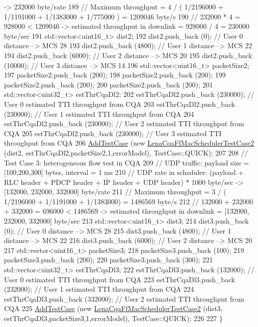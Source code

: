 \begin{DoxyCode}
{       -> 232000 byte/rate }
189   \textcolor{comment}{// Maximum throughput = 4 / ( 1/2196000 + 1/1191000 + 1/1383000 + 1/775000 ) = 1209046 byte/s}
190   \textcolor{comment}{// 232000 * 4 = 928000 < 1209046 -> estimated throughput in downlink = 928000 / 4 = 230000 byte/sec}
191   std::vector<uint16\_t> dist2;
192   dist2.push\_back (0);       \textcolor{comment}{// User 0 distance --> MCS 28}
193   dist2.push\_back (4800);    \textcolor{comment}{// User 1 distance --> MCS 22}
194   dist2.push\_back (6000);    \textcolor{comment}{// User 2 distance --> MCS 20}
195   dist2.push\_back (10000);   \textcolor{comment}{// User 3 distance --> MCS 14}
196   std::vector<uint16\_t> packetSize2;
197   packetSize2.push\_back (200);
198   packetSize2.push\_back (200);
199   packetSize2.push\_back (200);
200   packetSize2.push\_back (200);
201   std::vector<uint32\_t> estThrCqaDl2;
202   estThrCqaDl2.push\_back (230000); \textcolor{comment}{// User 0 estimated TTI throughput from CQA}
203   estThrCqaDl2.push\_back (230000); \textcolor{comment}{// User 1 estimated TTI throughput from CQA}
204   estThrCqaDl2.push\_back (230000); \textcolor{comment}{// User 2 estimated TTI throughput from CQA}
205   estThrCqaDl2.push\_back (230000); \textcolor{comment}{// User 3 estimated TTI throughput from CQA}
206   \hyperlink{classns3_1_1TestCase_a3718088e3eefd5d6454569d2e0ddd835}{AddTestCase} (\textcolor{keyword}{new} \hyperlink{classLenaCqaFfMacSchedulerTestCase2}{LenaCqaFfMacSchedulerTestCase2} (dist2,
      estThrCqaDl2,packetSize2,1,errorModel), TestCase::QUICK);
207 
208   \textcolor{comment}{// Test Case 3: heterogeneous flow test in CQA}
209   \textcolor{comment}{//   UDP traffic: payload size = [100,200,300] bytes, interval = 1 ms}
210   \textcolor{comment}{//   UDP rate in scheduler: (payload + RLC header + PDCP header + IP header + UDP header) * 1000 byte/sec
       -> [132000, 232000, 332000] byte/rate}
211   \textcolor{comment}{// Maximum throughput = 3 / ( 1/2196000 + 1/1191000 + 1/1383000) = 1486569 byte/s}
212   \textcolor{comment}{// 132000 + 232000 + 332000 = 696000 < 1486569 -> estimated throughput in downlink = [132000, 232000,
       332000] byte/sec}
213   std::vector<uint16\_t> dist3;
214   dist3.push\_back (0);    \textcolor{comment}{// User 0 distance --> MCS 28}
215   dist3.push\_back (4800);    \textcolor{comment}{// User 1 distance --> MCS 22}
216   dist3.push\_back (6000);    \textcolor{comment}{// User 2 distance --> MCS 20}
217   std::vector<uint16\_t> packetSize3;
218   packetSize3.push\_back (100);
219   packetSize3.push\_back (200);
220   packetSize3.push\_back (300);
221   std::vector<uint32\_t> estThrCqaDl3;
222   estThrCqaDl3.push\_back (132000); \textcolor{comment}{// User 0 estimated TTI throughput from CQA}
223   estThrCqaDl3.push\_back (232000); \textcolor{comment}{// User 1 estimated TTI throughput from CQA}
224   estThrCqaDl3.push\_back (332000); \textcolor{comment}{// User 2 estimated TTI throughput from CQA}
225   \hyperlink{classns3_1_1TestCase_a3718088e3eefd5d6454569d2e0ddd835}{AddTestCase} (\textcolor{keyword}{new} \hyperlink{classLenaCqaFfMacSchedulerTestCase2}{LenaCqaFfMacSchedulerTestCase2} (dist3,
      estThrCqaDl3,packetSize3,1,errorModel), TestCase::QUICK);
226 
227 \}
\end{DoxyCode}


